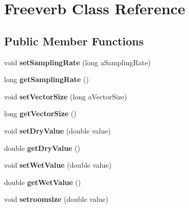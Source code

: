 \hypertarget{class_freeverb}{\section{Freeverb Class Reference}
\label{class_freeverb}
}
\subsection*{Public Member Functions}
\begin{DoxyCompactItemize}
\item 
\hypertarget{class_freeverb_a1a0d4cda386bd5d777e61edb48d5c718}{void {\bfseries set\-Sampling\-Rate} (long a\-Sampling\-Rate)}\label{class_freeverb_a1a0d4cda386bd5d777e61edb48d5c718}

\item 
\hypertarget{class_freeverb_a411641c9bb8c74e6e98004641f425d33}{long {\bfseries get\-Sampling\-Rate} ()}\label{class_freeverb_a411641c9bb8c74e6e98004641f425d33}

\item 
\hypertarget{class_freeverb_ab72ad6680ff9d4e38e6ac8c3c763d473}{void {\bfseries set\-Vector\-Size} (long a\-Vector\-Size)}\label{class_freeverb_ab72ad6680ff9d4e38e6ac8c3c763d473}

\item 
\hypertarget{class_freeverb_a9ff96bfb953b78c07b1049abe59b5484}{long {\bfseries get\-Vector\-Size} ()}\label{class_freeverb_a9ff96bfb953b78c07b1049abe59b5484}

\item 
\hypertarget{class_freeverb_a588242a98eba22df2881f32ed0e795c9}{void {\bfseries set\-Dry\-Value} (double value)}\label{class_freeverb_a588242a98eba22df2881f32ed0e795c9}

\item 
\hypertarget{class_freeverb_ae70d43bc6d0a23f6f7af7988180a0530}{double {\bfseries get\-Dry\-Value} ()}\label{class_freeverb_ae70d43bc6d0a23f6f7af7988180a0530}

\item 
\hypertarget{class_freeverb_a5d28dee76d8ae59d20f9f6ccb9f9757f}{void {\bfseries set\-Wet\-Value} (double value)}\label{class_freeverb_a5d28dee76d8ae59d20f9f6ccb9f9757f}

\item 
\hypertarget{class_freeverb_a82d92ff1d183dc6f631f977ccbb77362}{double {\bfseries get\-Wet\-Value} ()}\label{class_freeverb_a82d92ff1d183dc6f631f977ccbb77362}

\item 
\hypertarget{class_freeverb_a901a83127cfa8c424cf21e5ca04e6452}{void {\bfseries setroomsize} (double value)}\label{class_freeverb_a901a83127cfa8c424cf21e5ca04e6452}


\end{DoxyCompactItemize}
